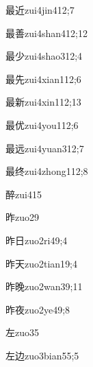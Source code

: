 \begin{verbete}{最近}{zui4jin4}{12;7}
\end{verbete}
\begin{verbete}{最善}{zui4shan4}{12;12}
\end{verbete}
\begin{verbete}{最少}{zui4shao3}{12;4}
\end{verbete}
\begin{verbete}{最先}{zui4xian1}{12;6}
\end{verbete}
\begin{verbete}{最新}{zui4xin1}{12;13}
\end{verbete}
\begin{verbete}{最优}{zui4you1}{12;6}
\end{verbete}
\begin{verbete}{最远}{zui4yuan3}{12;7}
\end{verbete}
\begin{verbete}{最终}{zui4zhong1}{12;8}
\end{verbete}
\begin{verbete}{醉}{zui4}{15}
\end{verbete}
\begin{verbete}{昨}{zuo2}{9}
\end{verbete}
\begin{verbete}{昨日}{zuo2ri4}{9;4}
\end{verbete}
\begin{verbete}{昨天}{zuo2tian1}{9;4}
\end{verbete}
\begin{verbete}{昨晚}{zuo2wan3}{9;11}
\end{verbete}
\begin{verbete}{昨夜}{zuo2ye4}{9;8}
\end{verbete}
\begin{verbete}{左}{zuo3}{5}
\end{verbete}
\begin{verbete}{左边}{zuo3bian5}{5;5}
\end{verbete}
